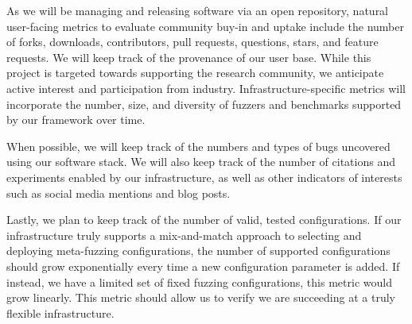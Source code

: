 
As we will be managing and releasing software via an open repository, 
natural user-facing metrics to evaluate community buy-in and uptake include the number of forks, downloads, contributors, pull requests, questions, 
stars, and feature requests. 
We will keep track of the provenance of our user base. While this project is targeted towards supporting the research community, 
we anticipate active interest and participation from industry. 
Infrastructure-specific metrics will incorporate the number, size, and diversity of fuzzers and benchmarks supported by our framework over time.

When possible, we will keep track of the numbers and types of bugs uncovered using our software stack.
We will also keep track of the number of citations and experiments enabled by our infrastructure, as well 
as other indicators of interests such as social media mentions and blog posts.

Lastly, we plan to keep track of the number of valid, tested configurations.  If our infrastructure truly supports a 
mix-and-match approach to selecting and deploying meta-fuzzing configurations, the number of supported configurations 
should grow exponentially every time a new configuration parameter is added.  If instead, we have a limited set of fixed
fuzzing configurations, this metric would grow linearly.  This metric should allow us to verify we are succeeding at a truly
flexible infrastructure.

